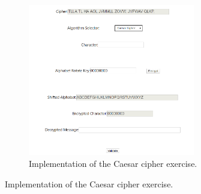 \documentclass{l4proj}
\begin{document}
\begin{figure}[H]
    \centering
    \begin{subfigure}[b]{0.65\textwidth}
        \centering
        \includegraphics[width=0.8\textwidth, frame]{images/CaesarImplementation.PNG}
        \caption{Implementation of the Caesar cipher exercise.}
        \label{fig:CaesarImp}
    \end{subfigure}


\end{figure}
\end{document}
